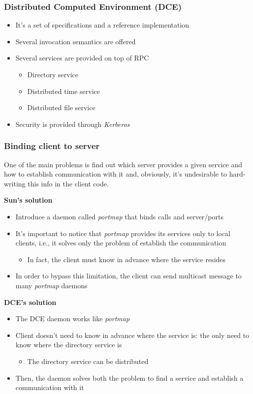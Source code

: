 \subsubsection{Distributed Computed Environment (DCE)}
\begin{itemize}
    \item It's a set of specifications and a reference implementation
    \item Several invocation semantics are offered
    \item Several services are provided on top of RPC
    \begin{itemize}
        \item Directory service
        \item Distributed time service
        \item Distributed file service
    \end{itemize}
    \item Security is provided through \textit{Kerberos}
\end{itemize}

\subsubsection{Binding client to server}
One of the main problems is find out which server provides a given service and how to establish communication with it and, obviously, it's undesirable to hard-writing this info in the client code.

\textbf{Sun's solution}
\begin{itemize}
    \item Introduce a daemon called \textit{portmap} that binds calls and server/ports
    \item It's important to notice that \textit{portmap} provides its services only to local clients, i.e., it solves only the problem of establish the communication
    \begin{itemize}
        \item In fact, the client must know in advance where the service resides
    \end{itemize}
    \item In order to bypass this limitation, the client can send multicast message to many \textit{portmap} daemons
\end{itemize}

\textbf{DCE's solution}
\begin{itemize}
    \item The DCE daemon works like \textit{portmap}
    \item Client doesn't need to know in advance where the service is: the only need to know where the directory service is
    \begin{itemize}
        \item The directory service can be distributed
    \end{itemize}
    \item Then, the daemon solves both the problem to find a service and establish a communication with it
\end{itemize}

